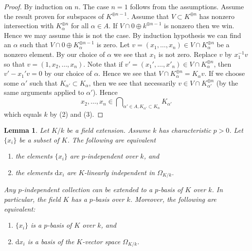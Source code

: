 \documentclass{amsart}
\theoremstyle{plain}
\newtheorem{lemma}[subsection]{Lemma}
\theoremstyle{definition}
\theoremstyle{remark}
\numberwithin{equation}{subsection}
\begin{document}
\begin{proof}
By induction on $n$. The case $n = 1$ follows from the assumptions.
Assume the result proven for subspaces of $K^{\oplus n - 1}$.
Assume that $V \subset K^{\oplus n}$ has nonzero intersection with
$K_\alpha^{\oplus n}$ for all $\alpha \in A$. If
$V \cap 0 \oplus k^{\oplus n - 1}$ is nonzero then we win. Hence we may
assume this is not the case. By induction hypothesis we can find
an $\alpha$ such that $V \cap 0 \oplus K_\alpha^{\oplus n - 1}$
is zero. Let $v = (x_1, \ldots, x_n) \in V \cap K_\alpha^{\oplus n}$
be a nonzero element.
By our choice of $\alpha$ we see that $x_1$ is not zero.
Replace $v$ by $x_1^{-1}v$ so that $v = (1, x_2, \ldots, x_n)$.
Note that if $v' = (x_1', \ldots, x'_n) \in V \cap K_\alpha^{\oplus n}$, then
$v' - x_1'v = 0$ by our choice of $\alpha$. Hence we see that
$V \cap K_\alpha^{\oplus n} = K_\alpha v$. If we choose some
$\alpha'$ such that $K_{\alpha'} \subset K_\alpha$, then we
see that necessarily $v \in V \cap K_{\alpha'}^{\oplus n}$ (by the
same arguments applied to $\alpha'$). Hence
$$
x_2, \ldots, x_n \in
\bigcap\nolimits_{\alpha' \in A, K_{\alpha'} \subset K_\alpha} K_{\alpha'}
$$
which equals $k$ by (2) and (3).
\end{proof}


\begin{lemma}
\label{lemma-p-basis}
Let $K/k$ be a field extension. Assume $k$ has characteristic
$p > 0$. Let $\{x_i\}$ be a subset of $K$. The following are equivalent
\begin{enumerate}
\item the elements $\{x_i\}$ are $p$-independent over $k$, and
\item the elements $\text{d}x_i$ are $K$-linearly independent
in $\Omega_{K/k}$.
\end{enumerate}
Any $p$-independent collection can be extended to a $p$-basis of $K$ over $k$.
In particular, the field $K$ has a $p$-basis over $k$.
Moreover, the following are equivalent:
\begin{enumerate}
\item[(a)] $\{x_i\}$ is a $p$-basis of $K$ over $k$, and
\item[(b)] $\text{d}x_i$ is a basis of the $K$-vector space $\Omega_{K/k}$.
\end{enumerate}
\end{lemma}
\end{document}
